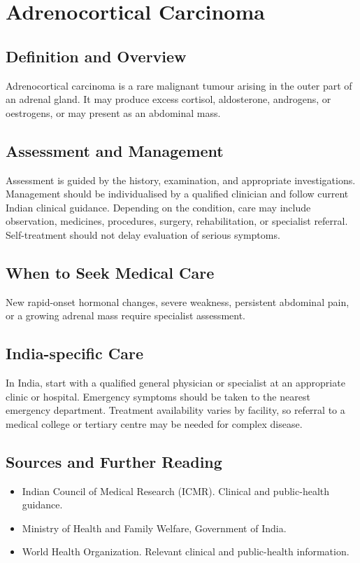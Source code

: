 \chapter{Adrenocortical Carcinoma}

\section*{Definition and Overview}
Adrenocortical carcinoma is a rare malignant tumour arising in the outer part of an adrenal gland. It may produce excess cortisol, aldosterone, androgens, or oestrogens, or may present as an abdominal mass.

\section*{Assessment and Management}
Assessment is guided by the history, examination, and appropriate investigations. Management should be individualised by a qualified clinician and follow current Indian clinical guidance. Depending on the condition, care may include observation, medicines, procedures, surgery, rehabilitation, or specialist referral. Self-treatment should not delay evaluation of serious symptoms.

\section*{When to Seek Medical Care}
New rapid-onset hormonal changes, severe weakness, persistent abdominal pain, or a growing adrenal mass require specialist assessment.

\section*{India-specific Care}
In India, start with a qualified general physician or specialist at an appropriate clinic or hospital. Emergency symptoms should be taken to the nearest emergency department. Treatment availability varies by facility, so referral to a medical college or tertiary centre may be needed for complex disease.

\section*{Sources and Further Reading}
\begin{itemize}
    \item Indian Council of Medical Research (ICMR). Clinical and public-health guidance.
    \item Ministry of Health and Family Welfare, Government of India.
    \item World Health Organization. Relevant clinical and public-health information.
\end{itemize}

